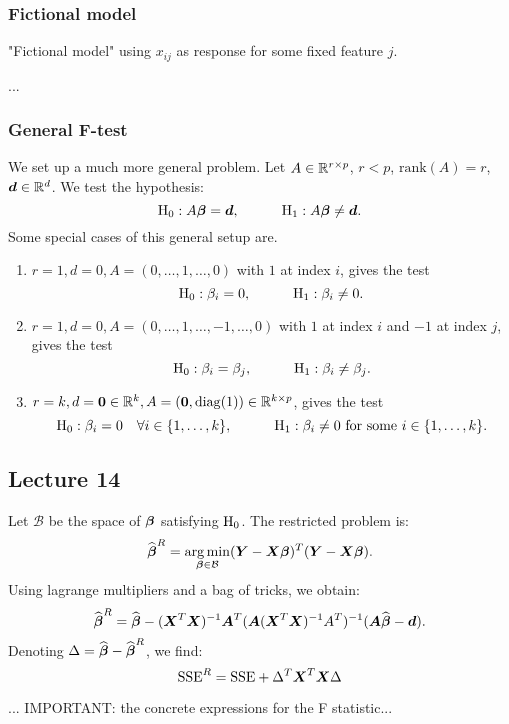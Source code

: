 \subsubsection*{Fictional model}
"Fictional model" using $x_{ij}$ as response for some fixed feature $j$. 




... \TODO

\subsubsection*{General F-test}

We set up a much more general problem. Let $A\in\mathbb{R}^{r\times p}$, $r<p$, $\mathrm{rank}(A)=r$, $\boldsymbol{d}\in\mathbb{R}^d$. We test the hypothesis:
$$
    \mathrm{H}_0 : A\boldsymbol{\beta} = \boldsymbol{d}, 
    \quad\quad\quad
    \mathrm{H}_1 : A\boldsymbol{\beta} \ne \boldsymbol{d}.
$$
Some special cases of this general setup are.
\begin{enumerate}
    \item $r=1, d=0, A=(0, \dots, 1, \dots, 0)$ with $1$ at index $i$, gives the test 
    $$
        \mathrm{H}_0 : \beta_i = 0, 
        \quad\quad\quad
        \mathrm{H}_1 : \beta_i \ne 0.
    $$
    \item $r=1, d=0, A=(0, \dots, 1, \dots, -1, \dots, 0)$ with $1$ at index $i$ and $-1$ at index $j$, gives the test 
    $$
        \mathrm{H}_0 : \beta_i = \beta_j,
        \quad\quad\quad
        \mathrm{H}_1 : \beta_i \ne \beta_j.
    $$
    \item $r=k, d=\boldsymbol{0}\in\mathbb{R}^k, A=(\boldsymbol{0}, \mathrm{diag}(1))\in\mathbb{R}^{k\times p}$, gives the test 
    $$
        \mathrm{H}_0 : \beta_i = 0 \quad\forall i\in\{1,\dots,k\},
        \quad\quad\quad
        \mathrm{H}_1 : \beta_i \ne 0 \textrm{ for some } i\in\{1,\dots,k\}.
    $$
\end{enumerate}

\subsection*{Lecture 14}

Let $\mathcal{B}$ be the space of $\boldsymbol{\beta}$ satisfying $\mathrm{H}_0$. The restricted problem is:
$$
    \widehat{\boldsymbol{\beta}}^R = \operatorname*{arg\,min}_{\boldsymbol{\beta}\in\mathcal{B}}(\boldsymbol{Y}-\boldsymbol{X}\boldsymbol{\beta})^T(\boldsymbol{Y}-\boldsymbol{X}\boldsymbol{\beta}).
$$
Using lagrange multipliers and a bag of tricks, we obtain:
$$
    \widehat{\boldsymbol{\beta}}^R = \widehat{\boldsymbol{\beta}} - (\boldsymbol{X}^T\boldsymbol{X})^{-1}\boldsymbol{A}^T(\boldsymbol{A}(\boldsymbol{X}^T\boldsymbol{X})^{-1}A^T)^{-1}(\boldsymbol{A}\widehat{\boldsymbol{\beta}}-\boldsymbol{d}).
$$
Denoting $\Delta = \widehat{\boldsymbol{\beta}}-\widehat{\boldsymbol{\beta}}^R$, we find:
$$
    \mathrm{SSE}^R = \mathrm{SSE} + \Delta^T\boldsymbol{X}^T\boldsymbol{X}\Delta
$$

... IMPORTANT: the concrete expressions for the F statistic...

